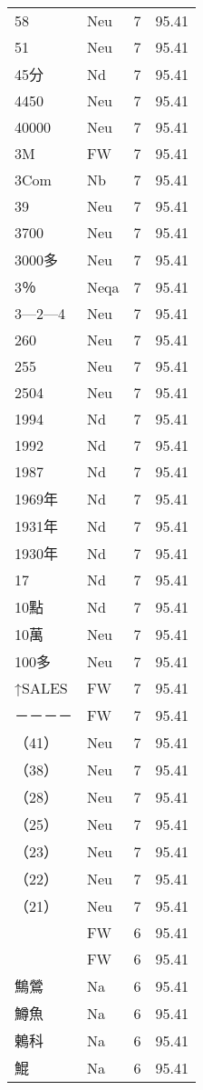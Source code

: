\documentclass[twocolumn]{book}
\begin{document}
\begin{supertabular}{llrr}
58 & Neu & 7 &  95.41\\
51 & Neu & 7 &  95.41\\
45分 & Nd & 7 &  95.41\\
4450 & Neu & 7 &  95.41\\
40000 & Neu & 7 &  95.41\\
3M & FW & 7 &  95.41\\
3Com & Nb & 7 &  95.41\\
39 & Neu & 7 &  95.41\\
3700 & Neu & 7 &  95.41\\
3000多 & Neu & 7 &  95.41\\
3％ & Neqa & 7 &  95.41\\
3—2—4 & Neu & 7 &  95.41\\
260 & Neu & 7 &  95.41\\
255 & Neu & 7 &  95.41\\
2504 & Neu & 7 &  95.41\\
1994 & Nd & 7 &  95.41\\
1992 & Nd & 7 &  95.41\\
1987 & Nd & 7 &  95.41\\
1969年 & Nd & 7 &  95.41\\
1931年 & Nd & 7 &  95.41\\
1930年 & Nd & 7 &  95.41\\
17 & Nd & 7 &  95.41\\
10點 & Nd & 7 &  95.41\\
10萬 & Neu & 7 &  95.41\\
100多 & Neu & 7 &  95.41\\
↑SALES & FW & 7 &  95.41\\
－－－－ & FW & 7 &  95.41\\
（41） & Neu & 7 &  95.41\\
（38） & Neu & 7 &  95.41\\
（28） & Neu & 7 &  95.41\\
（25） & Neu & 7 &  95.41\\
（23） & Neu & 7 &  95.41\\
（22） & Neu & 7 &  95.41\\
（21） & Neu & 7 &  95.41\\
 & FW & 6 &  95.41\\
 & FW & 6 &  95.41\\
鷦鶯 & Na & 6 &  95.41\\
鱒魚 & Na & 6 &  95.41\\
鶇科 & Na & 6 &  95.41\\
鯤 & Na & 6 &  95.41\\

\end{supertabular}
\end{document}
